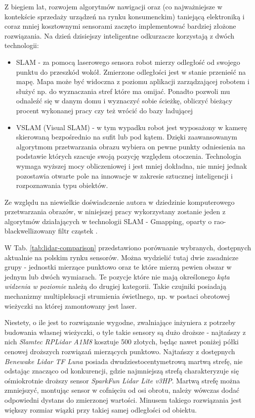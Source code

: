 Z biegiem lat, rozwojem algorytmów nawigacji oraz (co najważniejsze w kontekście sprzedaży urządzeń na rynku konsumenckim) taniejącą elektroniką i coraz mniej kosztownymi sensorami zaczęto implementować bardziej złożone rozwiązania. Na dzień dzisiejszy inteligentne odkurzacze korzystają z dwóch technologii:
\begin{itemize}
\item SLAM - za pomocą laserowego sensora robot mierzy odległość od swojego punktu do przeszkód wokół. Zmierzone odległości jest w stanie przenieść na mapę. Mapa może być widoczna z poziomu aplikacji zarządzającej robotem i służyć np. do wyznaczania stref które ma omijać. Ponadto pozwoli mu odnaleźć się w danym domu i wyznaczyć sobie ścieżkę, obliczyć bieżący procent wykonanej pracy czy też wrócić do bazy ładującej
\item VSLAM (Visual SLAM) - w tym wypadku robot jest wyposażony w kamerę skierowaną bezpośrednio na sufit lub pod kątem. Dzięki zaawansowanym algorytmom przetwarzania obrazu wybiera on pewne punkty odniesienia na podstawie których szacuje swoją pozycję względem otoczenia. Technologia wymaga wyższej mocy obliczeniowej i jest mniej dokładna, nie mniej jednak pozostawia otwarte pole na innowacje w zakresie sztucznej inteligencji i rozpoznawania typu obiektów.
\end{itemize}

Ze względu na niewielkie doświadczenie autora w dziedzinie komputerowego przetwarzania obrazów, w niniejszej pracy wykorzystany zostanie jeden z algorytmów działających w technologii SLAM - Gmapping, oparty o rao-blackwellizowany filtr cząstek \cite{Murphy2000}\cite{Grisetti2005}\cite{Grisetti2007}.

W Tab. \ref{tab:lidar-comparison} przedstawiono porównanie wybranych, dostępnych aktualnie na polskim rynku sensorów. Można wydzielić tutaj dwie zasadnicze grupy - jednostki mierzące punktowo oraz te które mierzą pewien obszar w jednym lub dwóch wymiarach. Te pozycje które nie mają określonego \emph{kąta widzenia w poziomie} należą do drugiej kategorii. Takie czujniki posiadają mechanizmy multipleksacji strumienia świetlnego, np. w postaci obrotowej wieżyczki na której zamontowany jest laser. 

Niestety, o ile jest to rozwiązanie wygodne, zwalniające inżyniera z potrzeby budowania własnej wieżyczki, o tyle takie sensory są dużo droższe - najtańszy z nich \emph{Slamtec RPLidar A1M8} kosztuje 500 złotych, będąc nawet poniżej półki cenowej droższych rozwiązań mierzących punktowo. Najtańszy z dostępnych \emph{Benewake Lidar TF Luna} posiada dwudziestocentymetrową martwą strefę, nie odstając znacząco od konkurencji, gdzie najmniejszą strefą charakteryzuje się ośmiokrotnie droższy sensor \emph{SparkFun Lidar Lite v3HP}. Martwą strefę można zmniejszyć, montując sensor w cofnięciu od osi obrotu, należy wówczas dodać odpowiedni dystans do zmierzonej wartości. Minusem takiego rozwiązania jest większy rozmiar wiązki przy takiej samej odległości od obiektu. 

